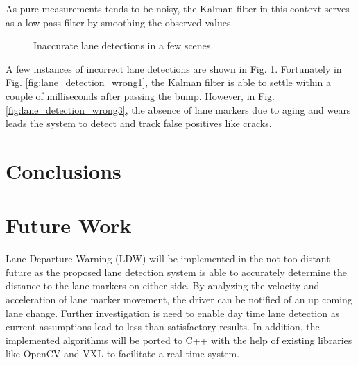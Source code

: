 \documentclass{article}
\begin{document}
As pure measurements tends to be noisy, the Kalman filter in this context serves as a low-pass filter by smoothing the observed values.
\begin{figure}[htb!]
  \centering
  \hspace{0.00001in}
  \caption{Inaccurate lane detections in a few scenes}
  \label{fig:lane_detection_wrong}
\end{figure}
A few instances of incorrect lane detections are shown in Fig. \ref{fig:lane_detection_wrong}. Fortunately in Fig. \ref{fig:lane_detection_wrong1}, the Kalman filter is able to settle within a couple of milliseconds after passing the bump. However, in Fig. \ref{fig:lane_detection_wrong3}, the absence of lane markers due to aging and wears leads the system to detect and track false positives like cracks.

\section{Conclusions}
\label{sec:concl}

\section{Future Work}
\label{sec:print}
Lane Departure Warning (LDW) will be implemented in the not too distant future as the proposed lane detection system is able to accurately determine the distance to the lane markers on either side. By analyzing the velocity and acceleration of lane marker movement, the driver can be notified of an up coming lane change. Further investigation is need to enable day time lane detection as current assumptions lead to less than satisfactory results. In addition, the implemented algorithms will be ported to C++ with the help of existing libraries like OpenCV and VXL to facilitate a real-time system.
\end{document}
